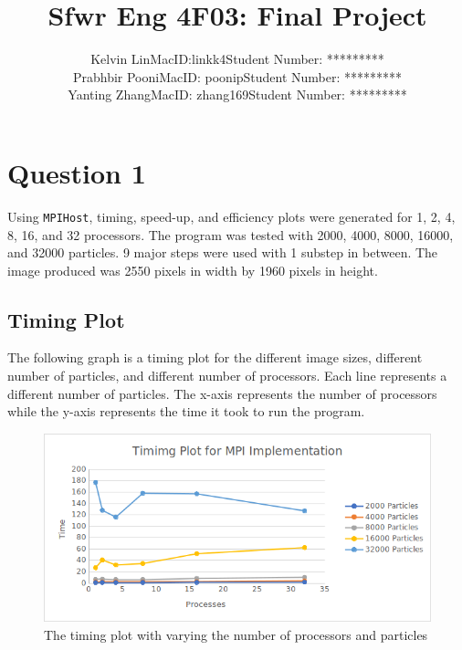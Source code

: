 \documentclass{article}
\begin{document}
\title{Sfwr Eng 4F03: Final Project}

\author{Kelvin Lin\hspace{10mm}MacID:linkk4\hspace{10mm}Student Number: *********\\Prabhbir Pooni\hspace{10mm}MacID: poonip\hspace{10mm}Student Number: *********\\Yanting Zhang\hspace{10mm}MacID: zhang169\hspace{10mm}Student Number: *********}

\maketitle

\section{Question 1}
Using \texttt{MPIHost}, timing, speed-up, and efficiency plots were generated for 1, 2, 4, 8, 16, and 32 processors. The program was tested with 2000, 4000, 8000, 16000, and 32000 particles. 9 major steps were used with 1 substep in between. The image produced was 2550 pixels in width by 1960 pixels in height.

\subsection{Timing Plot}
The following graph is a timing plot for the different image sizes, different number of particles, and different number of processors. Each line represents a different number of particles. The x-axis represents the number of processors while the y-axis represents the time it took to run the program.

\begin{figure}[H]
	\begin{center}
		\hspace*{-0.5cm}                                                           
  		\includegraphics[scale=0.83]{Report_Assets/timingmpi.png}
  	\end{center}
  	\caption{The timing plot with varying the number of processors and particles}
\end{figure}
\end{document}
